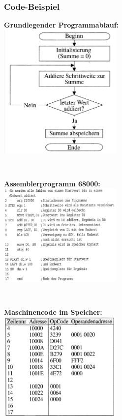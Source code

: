 \subsubsection{Code-Beispiel}
\begin{minipage}[t]{6cm}
	\textbf{Grundlegender Programmablauf:}\\
	\includegraphics[width=6cm]{pics/Bsp-Programmablauf}
\end{minipage}
%
\begin{minipage}{0.25cm}
	\ \
\end{minipage}
%
\begin{minipage}[t]{6cm}
	\textbf{Assemblerprogramm 68000:}\\
	\includegraphics[width=6cm]{pics/Bsp-Assembler}
	
\end{minipage}
%
\begin{minipage}{0.25cm}
	\ \
\end{minipage}
%
\begin{minipage}[t]{6cm}
	\textbf{Maschinencode im Speicher:}\\
	\includegraphics[width=6cm]{pics/Bsp-Maschinencode}
\end{minipage}